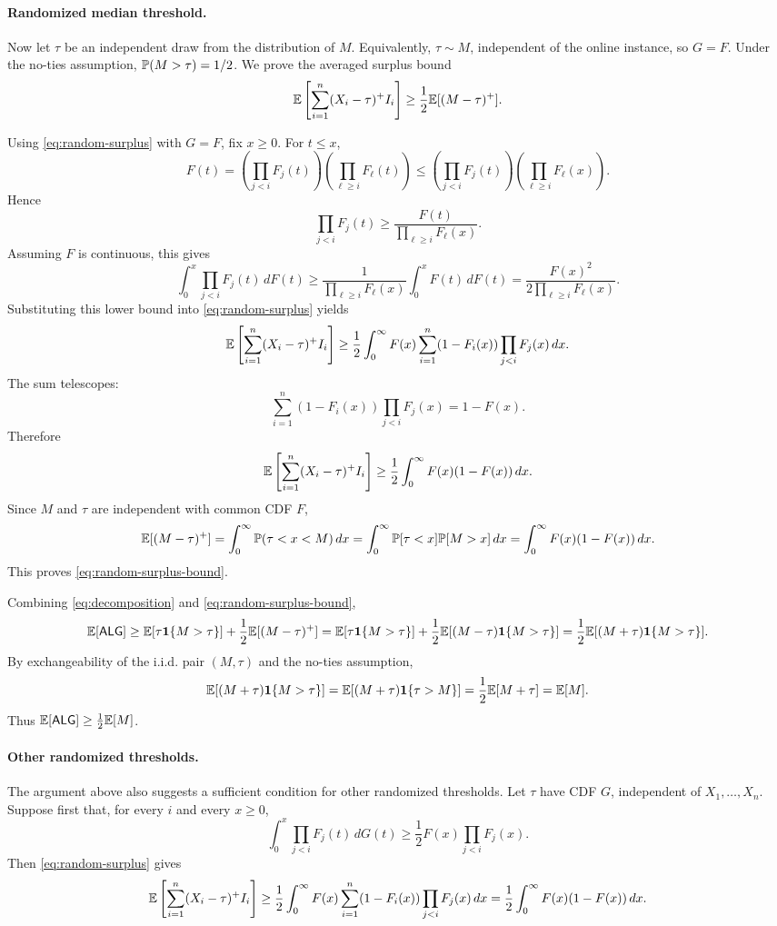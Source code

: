 \paragraph{Randomized median threshold.}
Now let $\tau$ be an independent draw from the distribution of $M$. Equivalently, $\tau\sim M$, independent of the online instance, so $G=F$. Under the no-ties assumption, $\mathbb{P}(M>\tau)=1/2$. We prove the averaged surplus bound
\begin{equation}
\mathbb{E}\left[\sum_{i=1}^n (X_i-\tau)^+I_i\right]
\ge
\frac12\mathbb{E}[(M-\tau)^+].
\label{eq:random-surplus-bound}
\end{equation}

Using \eqref{eq:random-surplus} with $G=F$, fix $x\ge 0$. For $t\le x$,
\[
F(t)
=
\left(\prod_{j<i}F_j(t)\right)
\left(\prod_{\ell\ge i}F_\ell(t)\right)
\le
\left(\prod_{j<i}F_j(t)\right)
\left(\prod_{\ell\ge i}F_\ell(x)\right).
\]
Hence
\[
\prod_{j<i}F_j(t)
\ge
\frac{F(t)}{\prod_{\ell\ge i}F_\ell(x)}.
\]
Assuming $F$ is continuous, this gives
\[
\int_0^x \prod_{j<i}F_j(t)\,dF(t)
\ge
\frac{1}{\prod_{\ell\ge i}F_\ell(x)}
\int_0^x F(t)\,dF(t)
=
\frac{F(x)^2}{2\prod_{\ell\ge i}F_\ell(x)}.
\]
Substituting this lower bound into \eqref{eq:random-surplus} yields
\[
\mathbb{E}\left[\sum_{i=1}^n (X_i-\tau)^+I_i\right]
\ge
\frac12
\int_0^\infty
F(x)
\sum_{i=1}^n (1-F_i(x))\prod_{j<i}F_j(x)\,dx.
\]
The sum telescopes:
\[
\sum_{i=1}^n (1-F_i(x))\prod_{j<i}F_j(x)
=
1-F(x).
\]
Therefore
\[
\mathbb{E}\left[\sum_{i=1}^n (X_i-\tau)^+I_i\right]
\ge
\frac12\int_0^\infty F(x)(1-F(x))\,dx.
\]
Since $M$ and $\tau$ are independent with common CDF $F$,
\[
\mathbb{E}[(M-\tau)^+]
=
\int_0^\infty \mathbb{P}(\tau<x<M)\,dx
=
\int_0^\infty \mathbb{P}[\tau<x]\mathbb{P}[M>x]\,dx
=
\int_0^\infty F(x)(1-F(x))\,dx.
\]
This proves \eqref{eq:random-surplus-bound}.

Combining \eqref{eq:decomposition} and \eqref{eq:random-surplus-bound},
\[
\mathbb{E}[\mathsf{ALG}]
\ge
\mathbb{E}[\tau\mathbf{1}\{M>\tau\}]
+
\frac12\mathbb{E}[(M-\tau)^+]
=
\mathbb{E}[\tau\mathbf{1}\{M>\tau\}]
+
\frac12\mathbb{E}[(M-\tau)\mathbf{1}\{M>\tau\}]
=
\frac12\mathbb{E}[(M+\tau)\mathbf{1}\{M>\tau\}].
\]
By exchangeability of the i.i.d. pair $(M,\tau)$ and the no-ties assumption,
\[
\mathbb{E}[(M+\tau)\mathbf{1}\{M>\tau\}]
=
\mathbb{E}[(M+\tau)\mathbf{1}\{\tau>M\}]
=
\frac12\mathbb{E}[M+\tau]
=
\mathbb{E}[M].
\]
Thus $\mathbb{E}[\mathsf{ALG}]\ge \frac12\mathbb{E}[M]$.

\paragraph{Other randomized thresholds.}

The argument above also suggests a sufficient condition for other randomized thresholds. Let $\tau$ have CDF $G$, independent of $X_1,\ldots,X_n$. Suppose first that, for every $i$ and every $x\ge 0$,
\begin{equation}
\int_0^x \prod_{j<i}F_j(t)\,dG(t)
\ge
\frac12 F(x)\prod_{j<i}F_j(x).
\label{eq:general-random-surplus-certificate}
\end{equation}
Then \eqref{eq:random-surplus} gives
\[
\mathbb{E}\left[\sum_{i=1}^n (X_i-\tau)^+I_i\right]
\ge
\frac12
\int_0^\infty
F(x)
\sum_{i=1}^n (1-F_i(x))\prod_{j<i}F_j(x)\,dx
=
\frac12\int_0^\infty F(x)(1-F(x))\,dx.
\]

